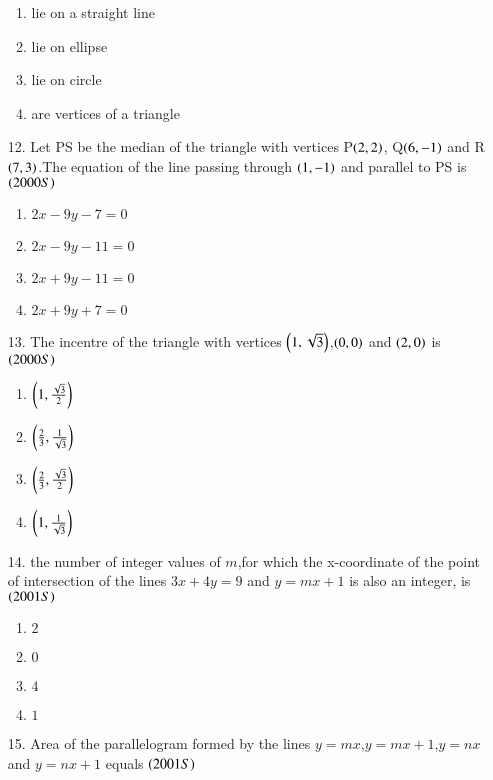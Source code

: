 \documentclass[journal,12pt,onecolumn]{IEEEtran}
\theoremstyle{remark}
\begin{document}
\begin{enumerate}
\begin{enumerate}
        \item lie on a straight line
        \item lie on ellipse
        \item lie on circle
        \item are vertices of a triangle 
    
\end{enumerate}
\item[12.] Let PS be the median of the triangle with vertices P$\left(2,2\right)$, Q$\left(6,-1\right)$ and R$\left(7,3\right)$.The equation of the line passing through $\left(1,-1\right)$ and parallel to PS is 
\hfill{$\left(2000S\right)$}
\begin{enumerate}

      \item $2x-9y-7=0$  
      \item $2x-9y-11=0$
      \item $2x+9y-11=0$
      \item $2x+9y+7=0$

\end{enumerate}
\item[13.] The incentre of the triangle with vertices $\left(1,\sqrt{3}\right)$,$\left(0,0\right)$ and $\left(2,0\right)$ is 
\hfill{$\left(2000S\right)$}
\begin{enumerate}
    
     \item $\left(1,\frac{\sqrt{3}}{2}\right)$
     \item $\left(\frac{2}{3},\frac{1}{\sqrt{3}}\right)$
     \item $\left(\frac{2}{3},\frac{\sqrt{3}}{2}\right)$
     \item $\left(1,\frac{1}{\sqrt{3}}\right)$
    
\end{enumerate}
\item[14.] the number of integer values of $m$,for which the x-coordinate of the point of intersection of the lines $3x+4y=9$ and $y=mx+1$ is also an integer, is 
\hfill{$\left(2001S\right)$}
\begin{enumerate}
    
    \item $2$
    \item $0$
     \item $4$
     \item $1$
    
\end{enumerate}
\item[15.] Area of the parallelogram formed by the lines $y=mx$,$y=mx+1$,$y=nx$ and $y=nx+1$ equals
\hfill{$\left(2001S\right)$}
\begin{enumerate}
    

\end{enumerate}
\end{enumerate}
\end{document}
